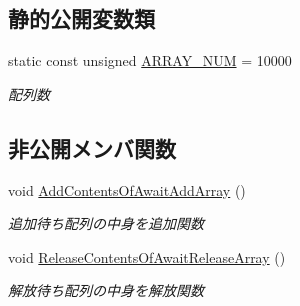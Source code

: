 \subsection*{静的公開変数類}
\begin{DoxyCompactItemize}
\item 
static const unsigned \mbox{\hyperlink{class_update_manager_a280b884fb6a025cfd92d4f93086c60c6}{A\+R\+R\+A\+Y\+\_\+\+N\+UM}} = 10000
\begin{DoxyCompactList}\small\item\em 配列数 \end{DoxyCompactList}\end{DoxyCompactItemize}
\subsection*{非公開メンバ関数}
\begin{DoxyCompactItemize}
\item 
void \mbox{\hyperlink{class_update_manager_a7bb1af3bffcc4d72333ac86ae411891e}{Add\+Contents\+Of\+Await\+Add\+Array}} ()
\begin{DoxyCompactList}\small\item\em 追加待ち配列の中身を追加関数 \end{DoxyCompactList}\item 
void \mbox{\hyperlink{class_update_manager_ac87db8037fbfb800187c50ca22a1f01d}{Release\+Contents\+Of\+Await\+Release\+Array}} ()
\begin{DoxyCompactList}\small\item\em 解放待ち配列の中身を解放関数 \end{DoxyCompactList}\end{DoxyCompactItemize}

